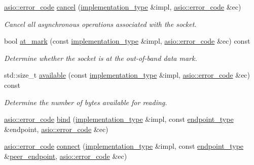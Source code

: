 \begin{DoxyCompactItemize}
\hyperlink{classasio_1_1error__code}{asio\+::error\+\_\+code} \hyperlink{classasio_1_1raw__socket__service_a9f310b13cf931cdfe65fa819bad722d3}{cancel} (\hyperlink{classasio_1_1raw__socket__service_aa2e0ef73d6504fbcab510cb835e9e3d9}{implementation\+\_\+type} \&impl, \hyperlink{classasio_1_1error__code}{asio\+::error\+\_\+code} \&ec)
\begin{DoxyCompactList}\small\item\em Cancel all asynchronous operations associated with the socket. \end{DoxyCompactList}\item 
bool \hyperlink{classasio_1_1raw__socket__service_a45c4a90bb8ba4f8aac6200c92636ca4e}{at\+\_\+mark} (const \hyperlink{classasio_1_1raw__socket__service_aa2e0ef73d6504fbcab510cb835e9e3d9}{implementation\+\_\+type} \&impl, \hyperlink{classasio_1_1error__code}{asio\+::error\+\_\+code} \&ec) const 
\begin{DoxyCompactList}\small\item\em Determine whether the socket is at the out-\/of-\/band data mark. \end{DoxyCompactList}\item 
std\+::size\+\_\+t \hyperlink{classasio_1_1raw__socket__service_a64f8ea11eafa7d796ade1f7cfeecf63c}{available} (const \hyperlink{classasio_1_1raw__socket__service_aa2e0ef73d6504fbcab510cb835e9e3d9}{implementation\+\_\+type} \&impl, \hyperlink{classasio_1_1error__code}{asio\+::error\+\_\+code} \&ec) const 
\begin{DoxyCompactList}\small\item\em Determine the number of bytes available for reading. \end{DoxyCompactList}\item 
\hyperlink{classasio_1_1error__code}{asio\+::error\+\_\+code} \hyperlink{classasio_1_1raw__socket__service_afb89fa2a6726df74b952c8ee4bc48304}{bind} (\hyperlink{classasio_1_1raw__socket__service_aa2e0ef73d6504fbcab510cb835e9e3d9}{implementation\+\_\+type} \&impl, const \hyperlink{classasio_1_1raw__socket__service_a8278f352f4e4424d431320f924e8b496}{endpoint\+\_\+type} \&endpoint, \hyperlink{classasio_1_1error__code}{asio\+::error\+\_\+code} \&ec)
\item 
\hyperlink{classasio_1_1error__code}{asio\+::error\+\_\+code} \hyperlink{classasio_1_1raw__socket__service_a66508109d7ba310620133b31a1d88aad}{connect} (\hyperlink{classasio_1_1raw__socket__service_aa2e0ef73d6504fbcab510cb835e9e3d9}{implementation\+\_\+type} \&impl, const \hyperlink{classasio_1_1raw__socket__service_a8278f352f4e4424d431320f924e8b496}{endpoint\+\_\+type} \&\hyperlink{classasio_1_1raw__socket__service_ad9ddc4af36bf42586989e53bbd880cd5}{peer\+\_\+endpoint}, \hyperlink{classasio_1_1error__code}{asio\+::error\+\_\+code} \&ec)

\end{DoxyCompactItemize}
